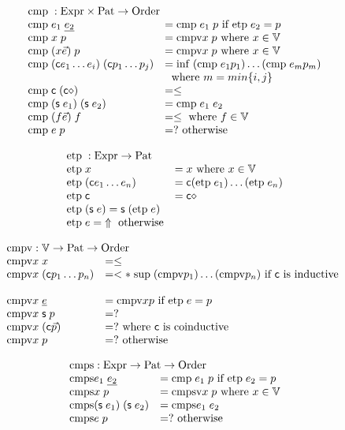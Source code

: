 \[
\begin{array}[t]{ll}
\multicolumn{2}{l}{\cmp : \Expr \times \Pat \ra \order}\\ 
\cmp e_1 \; \inacc{e_2} & = \cmp e_1 \; p \mbox{ if } \etp e_2 = p \\
\cmp x \; p & = \cmpv x \;p  \mbox{ where } x \in \cV \\
\cmp (x \vec{e}) \; p & = \cmpv x \;p  \mbox{ where } x \in \cV \\
\cmp (\cc e_1 \ldots e_i) \; (\cc p_1 \ldots p_j ) & = \info (\cmp e_1 p_1) \ldots (\cmp e_m p_m)\\
& \; \mbox { where } m = min\{i,j\}\\ 
\cmp \cc \; (\cc \diamond) & = \leq \\
\cmp (\s e_1) \; (\s e_2) & = \cmp e_1 \; e_2 \\
\cmp (f \vec{e}) \; f & = \leq \mbox{ where } f \in \cV \\
\cmp e \; p & = ? \mbox{ otherwise}
\end{array}
\]

\[
\begin{array}[t]{ll}
\multicolumn{2}{l}{\etp : \Expr \ra \Pat}\\ 
\etp x & = x \mbox{ where } x \in \cV \\
\etp (\cc e_1 \ldots e_n ) & = \cc (\etp e_1) \ldots (\etp e_n) \\
\etp \cc  & = \cc \diamond \\
\etp (\s e) = \s (\etp e) \\
\etp e = \stuck \mbox{ otherwise}
\end{array}
\]

\[
\begin{array}[t]{ll}
\multicolumn{2}{l}{\cmpv : \cV \ra \Pat \ra \order}\\ 
\cmpv x \; x & = \leq \\
\cmpv x \; (\cc p_1 \ldots p_n ) & = < * \; \supo (\cmpv p_1) \ldots (\cmpv p_n) \mbox{ if } \cc \mbox{ is inductive }\\   \\
\cmpv x \; \inacc{e} & = \cmpv x p \mbox{ if } \etp e = p \\
\cmpv x \; \s p & = ? \\
\cmpv x \; (\cc \vec{p}) & = ? \mbox{ where } \cc \mbox{ is coinductive}\\
\cmpv x \; p & = ? \mbox{ otherwise}
\end{array}
\]

\[
\begin{array}[t]{ll}
\multicolumn{2}{l}{\cmps : \Expr \ra \Pat \ra \order}\\ 
\cmps e_1 \; \inacc{e_2} & = \cmp e_1 \; p \mbox{ if } \etp e_2 = p \\
\cmps x \; p & = \cmpsv x \;p  \mbox{ where } x \in \cV \\
\cmps (\s e_1) \; (\s e_2) & = \cmps e_1 \; e_2 \\
\cmps e \; p & = ? \mbox{ otherwise}
\end{array}
\]


